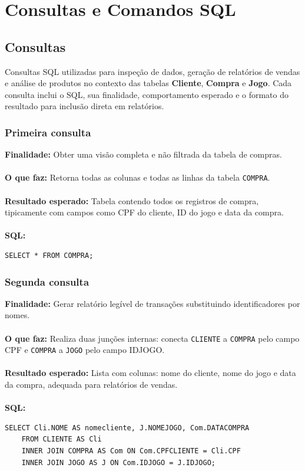 \documentclass[11pt]{article}
\begin{document}
\section{Consultas e Comandos SQL}
\subsection{Consultas}
Consultas SQL utilizadas para inspeção de dados, geração de relatórios de vendas e análise de produtos no contexto das tabelas \textbf{Cliente}, \textbf{Compra} e \textbf{Jogo}. Cada consulta inclui o SQL, sua finalidade, comportamento esperado e o formato do resultado para inclusão direta em relatórios.\\

\subsubsection{Primeira consulta}
\textbf{Finalidade:} Obter uma visão completa e não filtrada da tabela de compras.\\\\
\textbf{O que faz:} Retorna todas as colunas e todas as linhas da tabela \texttt{COMPRA}.\\\\
\textbf{Resultado esperado:} Tabela contendo todos os registros de compra, tipicamente com campos como CPF do cliente, ID do jogo e data da compra.\\\\
\textbf{SQL:}

    \begin{Verbatim}[breaklines=true, breakanywhere=true]
    SELECT * FROM COMPRA;
    \end{Verbatim}

\subsubsection{Segunda consulta}
\textbf{Finalidade:} Gerar relatório legível de transações substituindo identificadores por nomes.\\\\
\textbf{O que faz:} Realiza duas junções internas: conecta \texttt{CLIENTE} a \texttt{COMPRA} pelo campo CPF e \texttt{COMPRA} a \texttt{JOGO} pelo campo IDJOGO.\\\\
\textbf{Resultado esperado:} Lista com colunas: nome do cliente, nome do jogo e data da compra, adequada para relatórios de vendas.\\\\
\textbf{SQL:}
    \begin{Verbatim}[breaklines=true, breakanywhere=true]
    SELECT Cli.NOME AS nomecliente, J.NOMEJOGO, Com.DATACOMPRA
    FROM CLIENTE AS Cli
    INNER JOIN COMPRA AS Com ON Com.CPFCLIENTE = Cli.CPF
    INNER JOIN JOGO AS J ON Com.IDJOGO = J.IDJOGO;
    \end{Verbatim}
    
\end{document}
